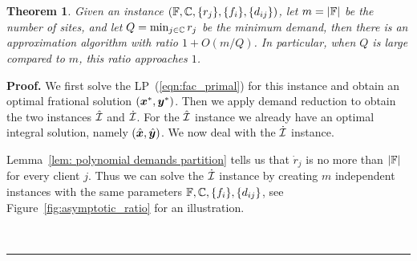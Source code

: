\documentclass[oneside,final]{ucr}
\newtheorem{theorem}{Theorem}
\newenvironment{proof}[1][Proof]{\textbf{#1.} }{\ \rule{0.5em}{0.5em}}
\def\ssp{\def\baselinestretch{1.0}\large\normalsize}
\begin{document}
\begin{theorem}
  \label{thm:largeR}
  Given an {\FTFP} instance $(\mathbb{F}, \mathbb{C}, \{r_j\}
  , \{f_i\}, \{d_{ij}\})$, let $m = |\mathbb{F}|$ be the
  number of sites, and let $Q = \min_{j\in\mathbb{C}} r_j$
  be the minimum demand, then there is an approximation
  algorithm with ratio $1 + O(m/Q)$. In particular, when $Q$
  is large compared to $m$, this ratio approaches $1$.
\end{theorem}
\begin{proof}
  We first solve the LP~(\ref{eqn:fac_primal}) for this
  instance and obtain an optimal frational solution
  $(\boldsymbol{x}^\ast, \boldsymbol{y}^\ast)$. Then we apply demand reduction
  to obtain the two instances $\hat {\mathcal{I}}$ and $\dot
  {\mathcal{I}}$. For the $\hat {\mathcal{I}}$ instance we already have an
  optimal integral solution, namely
  $(\hat{\boldsymbol{x}},\hat{\boldsymbol{y}})$. We now deal with the $\dot{\mathcal{I}}$
  instance.

  Lemma~\ref{lem: polynomial demands partition} tells us
  that $\dot r_j$ is no more than $|\mathbb{F}|$ for every
  client $j$. Thus we can solve the $\dot {\mathcal{I}}$ instance by
  creating $m$ independent {\UFL} instances with the same
  parameters $\mathbb{F}, \mathbb{C}, \{f_i\}, \{d_{ij}\}$,
  see Figure~\ref{fig:asymptotic_ratio} for an
  illustration.
  \ssp
  \begin{figure}[ht]
    \centering
\end{figure}
\end{proof}
\end{document}
